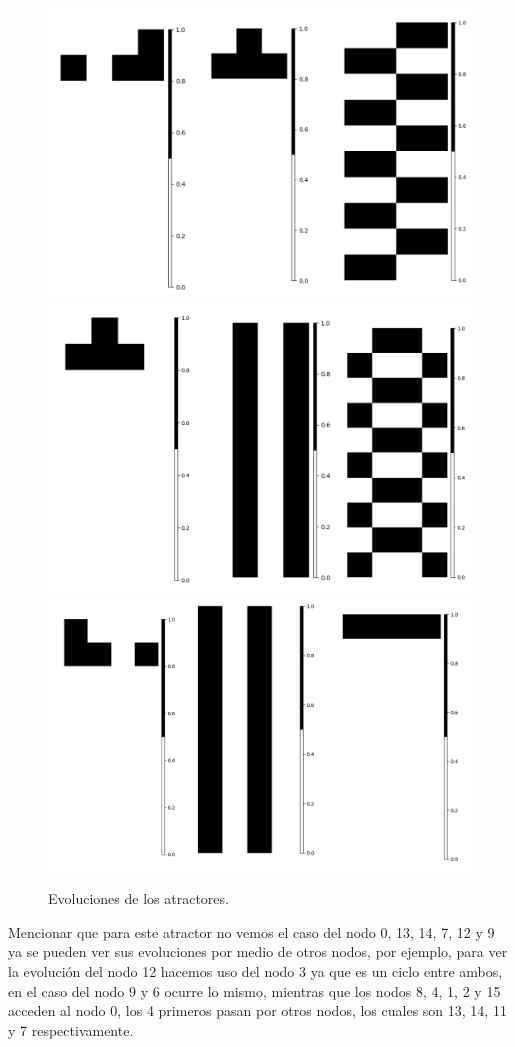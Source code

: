 \documentclass[11pt]{article}
\begin{document}
			\begin{figure}[H]
			\centering
			\includegraphics[scale=0.3]{resources/Atractores22/atractor_22_size_4_res.png}
			\includegraphics[scale=0.3]{resources/Atractores22/atractor_22_size_4_res1.png}
			\includegraphics[scale=0.3]{resources/Atractores22/atractor_22_size_4_res2.png}
			\caption{Evoluciones de los atractores.}\label{fig:picture}
			\end{figure}
			Mencionar que para este atractor no vemos el caso del nodo 0, 13, 14, 7, 12 y 9 ya se pueden ver sus evoluciones por medio de otros nodos, por ejemplo, para ver la evolución del nodo 12 hacemos uso del nodo 3 ya que es un ciclo entre ambos, en el caso del nodo 9 y 6 ocurre lo mismo, mientras que los nodos 8, 4, 1, 2 y 15 acceden al nodo 0, los 4 primeros pasan por otros nodos, los cuales son 13, 14, 11 y 7 respectivamente.
\end{document}
